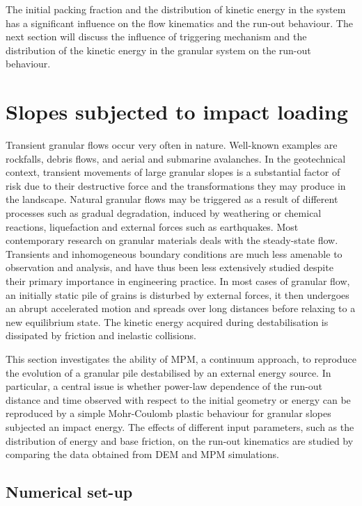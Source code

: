 The initial packing fraction and the distribution of kinetic energy in the 
system has a significant influence on the flow kinematics and the run-out 
behaviour. The next section will discuss the influence of triggering mechanism 
and the distribution of the kinetic energy in the granular system on the 
run-out behaviour.  

\clearpage

\section{Slopes subjected to impact loading}
\label{sec:slope}
Transient granular flows occur very often in nature. Well-known examples are 
rockfalls, debris flows, and aerial and submarine avalanches. In the 
geotechnical context, transient movements of large granular slopes 
is a substantial factor of risk due to their destructive force and the 
transformations they may produce in the landscape. Natural granular flows 
may be triggered as a result of different processes such as gradual 
degradation, induced by weathering or chemical reactions, liquefaction and 
external forces such as earthquakes. Most contemporary research on granular 
materials deals with the steady-state flow. Transients and inhomogeneous 
boundary conditions are much less amenable to observation and analysis, and 
have thus been less extensively studied despite their primary importance in 
engineering practice. In most cases of granular flow, an initially static pile 
of grains is disturbed by external forces, it then undergoes an abrupt 
accelerated motion and spreads over long distances before relaxing to a new 
equilibrium state. The kinetic energy acquired during destabilisation is 
dissipated by friction and inelastic collisions.

This section investigates the ability of MPM, a continuum approach, to 
reproduce the evolution of a granular pile destabilised by an external energy 
source. In particular, a central issue is whether power-law dependence of the 
run-out distance and time observed with respect to the initial geometry or 
energy can be reproduced by a simple Mohr-Coulomb plastic behaviour for 
granular slopes subjected an impact energy. The effects of different input 
parameters, such as the distribution of energy and base friction, on the 
run-out kinematics are studied by comparing the data obtained from DEM and MPM 
simulations.

\subsection{Numerical set-up}
\label{sec:num}

